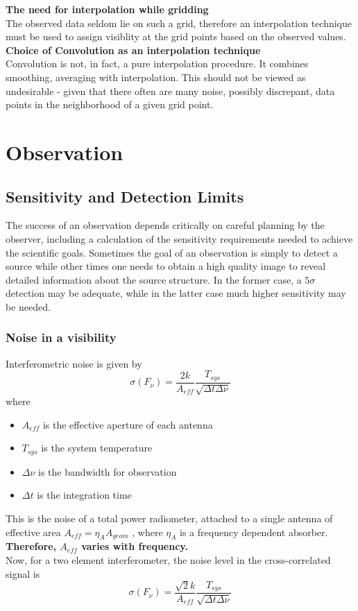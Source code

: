 \documentclass[10pt]{report}
\newcommand{\tbf}[1]{\textbf{#1}}
\newcommand{\cbox}{tcolorbox}
\begin{document}
 \tbf{The need for interpolation while gridding}\\
 
 The observed data seldom lie on such a grid, therefore an interpolation technique must be used to assign visiblity at the grid points based on the observed values.\\
 
 \tbf{Choice of Convolution as an interpolation technique}\\
 
 Convolution is not, in fact, a pure interpolation procedure. It combines smoothing, averaging with interpolation. This should not be viewed as undesirable - given that there often are many noise, possibly discrepant, data points in the neighborhood of a given grid point.

 \newpage
 \section{Observation}
 \subsection{Sensitivity and Detection Limits}
 \begin{\cbox}
 The success of an observation depends critically on careful planning by the observer, including a calculation of the sensitivity requirements needed to achieve the scientific goals.  Sometimes the goal of an observation is simply to detect a source while other times one needs to obtain a high quality image to reveal detailed information about the source structure.  In the former case, a $5\sigma$ detection may be adequate, while in the latter case much higher sensitivity may be needed. 
 \end{\cbox}
 \subsubsection{Noise in a visibility}
 Interferometric noise is given by 
 \begin{equation}
 \sigma(F_\nu)=\frac{2k}{A_{eff}}\frac{T_{sys}}{\sqrt{\Delta t \Delta \nu}}
 \end{equation}
 where 
 \begin{itemize}
 \item $A_{eff}$ is the effective aperture of each antenna
 \item $T_{sys}$ is the system temperature
 \item $\Delta \nu$ is the bandwidth for observation
 \item $\Delta t$ is the integration time
 \end{itemize}
 This is the noise of a total power radiometer, attached to a single antenna of effective area $A_{eff}=\eta_A A_{geom}$ , where $\eta_A$ is a frequency dependent absorber. \tbf{Therefore, $A_{eff}$ varies with frequency.}\\
 Now, for a two element interferometer, the noise level in the cross-correlated signal is 
  \begin{equation}\label{eq:noise}
 \sigma(F_\nu)=\frac{\sqrt{2}k}{A_{eff}}\frac{T_{sys}}{\sqrt{\Delta t \Delta \nu}}
 \end{equation}
 
\end{document}
